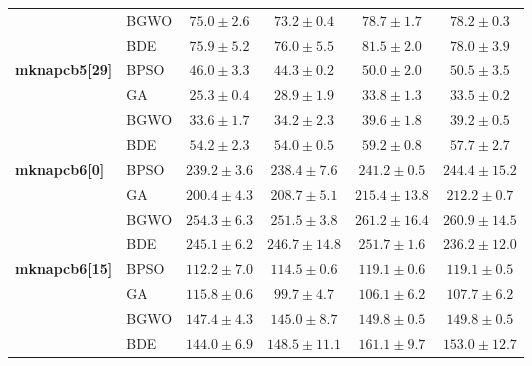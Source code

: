 \begin{table}[htbp]
\begin{tabular*}{\textwidth}{@{\extracolsep{\fill}}llcccc@{}}
                       & BGWO  &           $75.0 \pm 2.6$ &  $\mathbf{73.2 \pm 0.4}$ &           $78.7 \pm 1.7$ &           $78.2 \pm 0.3$ \\
                       & BDE   &  $\mathbf{75.9 \pm 5.2}$ &           $76.0 \pm 5.5$ &           $81.5 \pm 2.0$ &           $78.0 \pm 3.9$ \\
    \midrule
    \textbf{mknapcb5[29]} & BPSO  &           $46.0 \pm 3.3$ &  $\mathbf{44.3 \pm 0.2}$ &           $50.0 \pm 2.0$ &           $50.5 \pm 3.5$ \\
                       & GA    &  $\mathbf{25.3 \pm 0.4}$ &           $28.9 \pm 1.9$ &           $33.8 \pm 1.3$ &           $33.5 \pm 0.2$ \\
                       & BGWO  &  $\mathbf{33.6 \pm 1.7}$ &           $34.2 \pm 2.3$ &           $39.6 \pm 1.8$ &           $39.2 \pm 0.5$ \\
                       & BDE   &           $54.2 \pm 2.3$ &  $\mathbf{54.0 \pm 0.5}$ &           $59.2 \pm 0.8$ &           $57.7 \pm 2.7$ \\
    \midrule
    \textbf{mknapcb6[0]} & BPSO  &          $239.2 \pm 3.6$ & $\mathbf{238.4 \pm 7.6}$ &          $241.2 \pm 0.5$ &         $244.4 \pm 15.2$ \\
                       & GA    & $\mathbf{200.4 \pm 4.3}$ &          $208.7 \pm 5.1$ &         $215.4 \pm 13.8$ &          $212.2 \pm 0.7$ \\
                       & BGWO  &          $254.3 \pm 6.3$ & $\mathbf{251.5 \pm 3.8}$ &         $261.2 \pm 16.4$ &         $260.9 \pm 14.5$ \\
                       & BDE   &          $245.1 \pm 6.2$ &         $246.7 \pm 14.8$ &          $251.7 \pm 1.6$ & $\mathbf{236.2 \pm 12.0}$ \\
    \midrule
    \textbf{mknapcb6[15]} & BPSO  & $\mathbf{112.2 \pm 7.0}$ &          $114.5 \pm 0.6$ &          $119.1 \pm 0.6$ &          $119.1 \pm 0.5$ \\
                       & GA    &          $115.8 \pm 0.6$ &  $\mathbf{99.7 \pm 4.7}$ &          $106.1 \pm 6.2$ &          $107.7 \pm 6.2$ \\
                       & BGWO  &          $147.4 \pm 4.3$ & $\mathbf{145.0 \pm 8.7}$ &          $149.8 \pm 0.5$ &          $149.8 \pm 0.5$ \\
                       & BDE   & $\mathbf{144.0 \pm 6.9}$ &         $148.5 \pm 11.1$ &          $161.1 \pm 9.7$ &         $153.0 \pm 12.7$ \\
    \midrule

\end{tabular*}
\end{table}
